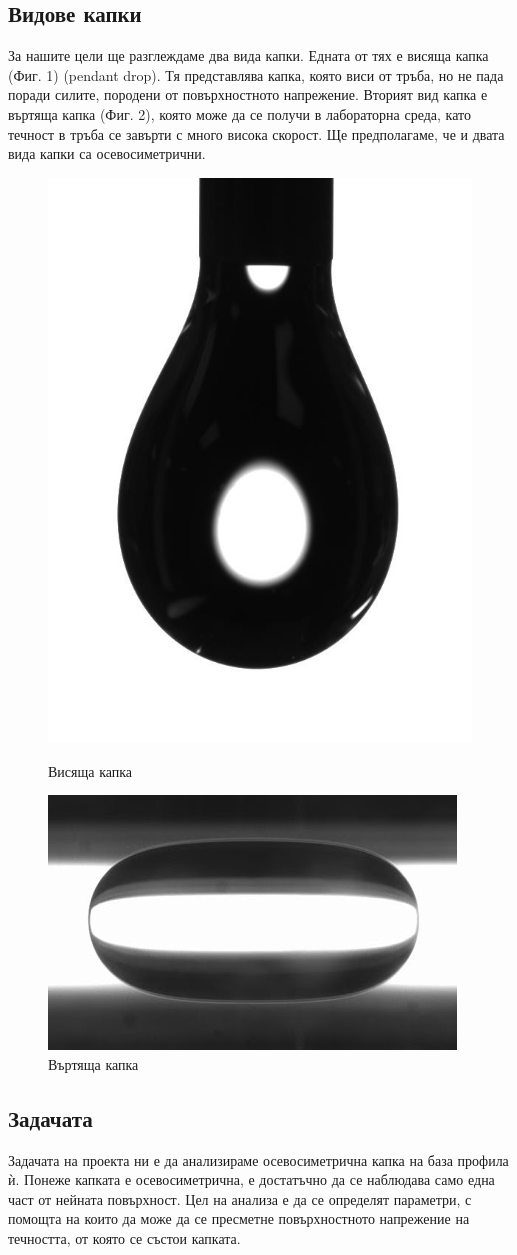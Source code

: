 \documentclass{article}
\begin{document}
\subsection{Видове капки}
За нашите цели ще разглеждаме два вида капки. Едната от тях е висяща капка (Фиг. 1) (pendant drop). Тя представлява капка, която виси от тръба, но не пада поради силите, породени от повърхностното напрежение. Вторият вид капка е въртяща капка (Фиг. 2), която може да се получи в лабораторна среда, като течност в тръба се завърти с много висока скорост. Ще предполагаме, че и двата вида капки са осевосиметрични.
\begin{figure}[H]
\centering
\begin{minipage}{0.5\textwidth}
  \centering
  \includegraphics[width=0.5\linewidth]{pendant_drop.jpg}
  \caption{Висяща капка}
\end{minipage}%
\begin{minipage}{0.5\textwidth}
  \centering
  \includegraphics[width=0.6\linewidth]{index.png}
  \caption{Въртяща капка}
\end{minipage}
\end{figure}

\subsection{Задачата}
Задачата на проекта ни е да анализираме осевосиметрична капка на база профила ѝ. Понеже капката е осевосиметрична, е достатъчно да се наблюдава само една част от нейната повърхност. Цел на анализа е да се определят параметри, с помощта на които да може да се пресметне повърхностното напрежение на течността, от която се състои капката.
\end{document}
